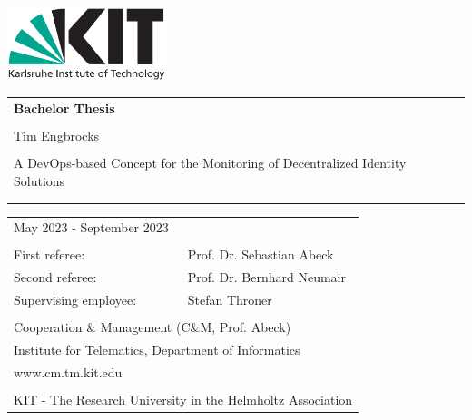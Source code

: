 \begin{titlepage}
\thispagestyle{empty}
\enlargethispage{2cm}

\sffamily
\vspace*{-3.2cm}
\hspace*{-0.6cm}
\includegraphics[height=2.14cm]{figures/kit-logo.png}

\begin{addmargin}{4cm}

\vfill

\begin{tabular}{p{12cm}}
	{\bfseries\huge Bachelor Thesis}\\
	\\
	{Tim Engbrocks} \vspace{2em} \\
	\\
	{\linespread{0.85}\selectfont \Huge A DevOps-based Concept for the Monitoring of Decentralized Identity Solutions\par}   \vspace{0.5em}\\
	{\LARGE } \vspace{0.5em} \\
	{\LARGE }
\end{tabular}
\vfill
\vfill
\vfill



\vspace{1em}
\begin{tabular}{ll}
	
        
	May 2023 - September 2023 \\
	\\
	First referee: 				& Prof. Dr. Sebastian Abeck \\
	Second referee:				& Prof. Dr. Bernhard Neumair \\
	Supervising employee:		& Stefan Throner \\
	\\
	\multicolumn{2}{l}{Cooperation \& Management (C\&M, Prof. Abeck)} \\
	\multicolumn{2}{l}{Institute for Telematics, Department of Informatics} \\
	\multicolumn{2}{l}{www.cm.tm.kit.edu} \\
	\\
	\multicolumn{2}{l}{\scriptsize{KIT - The Research University in the Helmholtz Association}}\\
\end{tabular}

\end{addmargin}
\newpage
\thispagestyle{empty}
\end{titlepage}